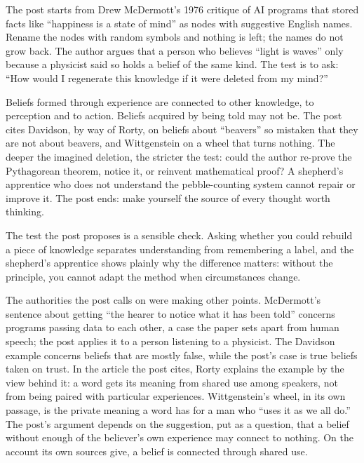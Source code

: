 \begin{afterword}
\summaryhead

The post starts from Drew McDermott's 1976 critique of AI programs that stored facts like ``happiness is a state of mind'' as nodes with suggestive English names. Rename the nodes with random symbols and nothing is left; the names do not grow back. The author argues that a person who believes ``light is waves'' only because a physicist said so holds a belief of the same kind. The test is to ask: ``How would I regenerate this knowledge if it were deleted from my mind?''

Beliefs formed through experience are connected to other knowledge, to perception and to action. Beliefs acquired by being told may not be. The post cites Davidson, by way of Rorty, on beliefs about ``beavers'' so mistaken that they are not about beavers, and Wittgenstein on a wheel that turns nothing. The deeper the imagined deletion, the stricter the test: could the author re-prove the Pythagorean theorem, notice it, or reinvent mathematical proof? A shepherd's apprentice who does not understand the pebble-counting system cannot repair or improve it. The post ends: make yourself the source of every thought worth thinking.

\responsehead

The test the post proposes is a sensible check. Asking whether you could rebuild a piece of knowledge separates understanding from remembering a label, and the shepherd's apprentice shows plainly why the difference matters: without the principle, you cannot adapt the method when circumstances change.

The authorities the post calls on were making other points. McDermott's sentence about getting ``the hearer to notice what it has been told'' concerns programs passing data to each other, a case the paper sets apart from human speech; the post applies it to a person listening to a physicist. The Davidson example concerns beliefs that are mostly false, while the post's case is true beliefs taken on trust. In the article the post cites, Rorty explains the example by the view behind it: a word gets its meaning from shared use among speakers, not from being paired with particular experiences. Wittgenstein's wheel, in its own passage, is the private meaning a word has for a man who ``uses it as we all do.'' The post's argument depends on the suggestion, put as a question, that a belief without enough of the believer's own experience may connect to nothing. On the account its own sources give, a belief is connected through shared use.


\end{afterword}

